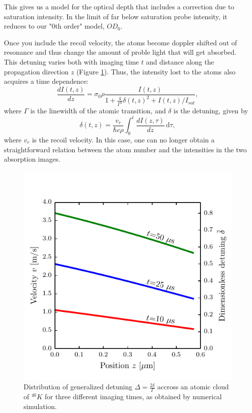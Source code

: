 \documentclass[12pt]{iopart}
\begin{document}
 This gives us a model for the optical depth that includes a correction due to saturation intensity. In the limit of far below saturation probe intensity, it reduces to our "0th order" model, $OD_0$. 
\par Once you include the recoil velocity, the atoms become doppler shifted out of resonance and thus change the amount of proble light that will get absorbed. This detuning varies both with imaging time $t$ and distance along the propagation direction $z$ (Figure \ref{fig:detunedBlobs}). Thus, the intensity lost to the atoms also acquires a time dependence: 
\begin{equation}
\frac{dI(t,z)}{dz}=\sigma_0 \rho \frac{I(t,z)}{1+\frac{4}{\Gamma^2}\delta(t,z)^2 +I(t,z)/I_{sat}}, \label{eq3}
\end{equation}
where $\Gamma$ is the linewidth of the atomic transition, and $\delta$ is the detuning, given by 
\begin{equation}
\delta(t,z)=\frac{v_r}{\hbar c \rho}\int_0^t \frac{dI(z,\tau)}{dz}\,\mathrm{d}\tau, \label{eq4} 
\end{equation}
where  $v_r$ is the recoil velocity. In this case, one can no longer obtain a straightforward relation between the atom number and the intensities in the two absorption images.
\begin{figure}
	\includegraphics*[scale=0.57]{figure1}
\caption{Distribution of generalized detuning $\Delta=\frac{2\delta}{\Gamma}$ accross an atomic cloud of $^{40}K$ for three different imaging times, as obtained by numerical simulation.}  
\label{fig:detunedBlobs}
\end{figure}
\end{document}
